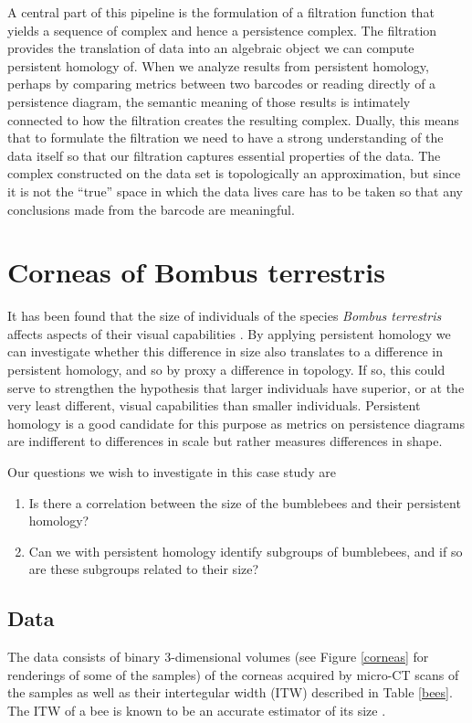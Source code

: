 A central part of this pipeline is the formulation of a filtration function that yields a sequence of complex and hence a persistence complex. The filtration provides the translation of data into an algebraic object we can compute persistent homology of. When we analyze results from persistent homology, perhaps by comparing metrics between two barcodes or reading directly of a persistence diagram, the semantic meaning of those results is intimately connected to how the filtration creates the resulting complex. Dually, this means that to formulate the filtration we need to have a strong understanding of the data itself so that our filtration captures essential properties of the data. The complex constructed on the data set is topologically an approximation, but since it is not the ``true'' space in which the data lives care has to be taken so that any conclusions made from the barcode are meaningful.


\section{Corneas of Bombus terrestris}
It has been found that the size of individuals of the species \textit{Bombus terrestris} affects aspects of their visual capabilities \cite{emily}. By applying persistent homology we can investigate whether this difference in size also translates to a difference in persistent homology, and so by proxy a difference in topology. If so, this could serve to strengthen the hypothesis that larger individuals have superior, or at the very least different, visual capabilities than smaller individuals. Persistent homology is a good candidate for this purpose as metrics on persistence diagrams are indifferent to differences in scale but rather measures differences in shape.

Our questions we wish to investigate in this case study are
\begin{enumerate}
  \item Is there a correlation between the size of the bumblebees and their persistent homology?
  \item Can we with persistent homology identify subgroups of bumblebees, and if so are these subgroups related to their size?

\end{enumerate}
\subsection{Data}
The data consists of binary 3-dimensional volumes (see Figure \ref{corneas} for renderings of some of the samples) of the corneas acquired by micro-CT scans of the samples as well as their intertegular width (ITW) described in Table \ref{bees}. The ITW of a bee is known to be an accurate estimator of its size \cite{itw}.

